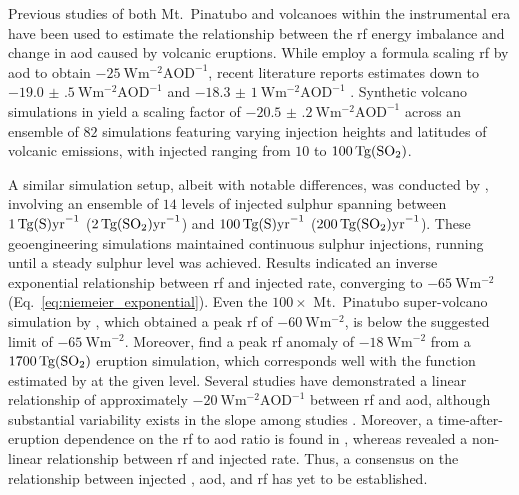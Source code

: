 \documentclass{ametsocV6.1}
\newcommand{\iso}[1][i]{{#1}njected \ce{SO2}}
\begin{document}
Previous studies of both Mt.\ Pinatubo \citep{mills2017,hansen2005} and volcanoes within
the instrumental era \citep{gregory2016} have been used to estimate the relationship
between the \gls{rf} energy imbalance and change in \gls{aod} caused by volcanic
eruptions. While \citet{myhre2013} employ a formula scaling \gls{rf} by \gls{aod} to
obtain \(\SI{-25}{\watt\metre^{-2}\mathrm{AOD}^{-1}}\), recent literature reports
estimates down to \(\SI{-19.0(5)}{\watt\metre^{-2}\mathrm{AOD}^{-1}}\)
\citep{gregory2016} and \(\SI{-18.3(10)}{\watt\metre^{-2}\mathrm{AOD}^{-1}}\)
\citep{mills2017}. Synthetic volcano simulations in \citet{marshall2020} yield a scaling
factor of \(\SI{-20.5(2)}{\watt\metre^{-2}\mathrm{AOD}^{-1}}\) across an ensemble of
\(82\) simulations featuring varying injection heights and latitudes of volcanic
emissions, with \iso{} ranging from \(10\) to \(\SI{100}{\tera\gram(\ce{SO2})}\).

A similar simulation setup, albeit with notable differences, was conducted by
\citet{niemeier2015}, involving an ensemble of \(14\) levels of injected sulphur
spanning between \(\SI{1}{\tera\gram(\ce{S})\mathrm{yr}^{-1}}\)
(\(\SI{2}{\tera\gram(\ce{SO2})\mathrm{yr}^{-1}}\)) and
\(\SI{100}{\tera\gram(\ce{S})\mathrm{yr}^{-1}}\)
(\(\SI{200}{\tera\gram(\ce{SO2})\mathrm{yr}^{-1}}\)). These geoengineering simulations
maintained continuous sulphur injections, running until a steady sulphur level was
achieved. Results indicated an inverse exponential relationship between \gls{rf} and
\iso{} rate, converging to \(\SI{-65}{\watt\metre^{-2}}\)
(Eq.~\ref{eq:niemeier_exponential}). Even the \(100\times\) Mt.\ Pinatubo super-volcano
simulation by \citet{jones2005}, which obtained a peak \gls{rf} of
\(\SI{-60}{\watt\metre^{-2}}\), is below the suggested limit of
\(\SI{-65}{\watt\metre^{-2}}\). Moreover, \citet{timmreck2010} find a peak \gls{rf}
anomaly of \(\SI{-18}{\watt\metre^{-2}}\) from a \(\SI{1700}{\tera\gram(\ce{SO2})}\)
eruption simulation, which corresponds well with the function estimated by
\citet{niemeier2015} at the given  level. Several studies have demonstrated a
linear relationship of approximately \(-\SI{20}{\watt\metre^{-2}\mathrm{AOD}^{-1}}\)
between \gls{rf} and \gls{aod}, although substantial variability exists in the slope
among studies \citep{mills2017,hansen2005,gregory2016,marshall2020,pitari2016b}.
Moreover, a time-after-eruption dependence on the \gls{rf} to \gls{aod} ratio is found
in \citet{marshall2020}, whereas \citet{niemeier2015} revealed a non-linear relationship
between \gls{rf} and \iso{} rate. Thus, a consensus on the relationship between \iso{},
\gls{aod}, and \gls{rf} has yet to be established.
\end{document}
